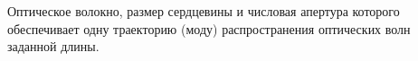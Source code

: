 Оптическое волокно, размер сердцевины и числовая апертура
которого обеспечивает одну траекторию (моду)
распространения оптических волн заданной длины.